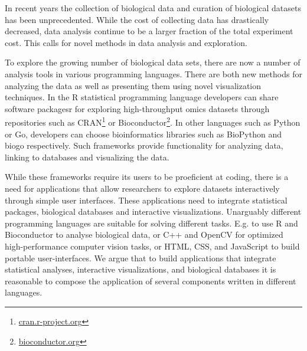 
In recent years the collection of biological data and curation of biological
datasets has been unprecedented. While the cost of collecting data has
drastically decreased, data analysis continue to be a larger fraction of the
total experiment cost.\cite{sboner2011real} This calls for novel methods in data
analysis and exploration. 

To explore the growing number of biological data sets, there are now a number of
analysis tools in various programming languages. There are
both new methods for analyzing the data as well as presenting them using novel
visualization techniques. 
In the R statistical programming language developers can share software
packagesr for exploring high-throughput omics datasets through repositories such
as CRAN\footnote{\url{cran.r-project.org}} or
Bioconductor\footnote{\url{bioconductor.org}}.
In other languages such as Python or Go, developers can choose bioinformatics
libraries such as BioPython\cite{biopython} and biogo\cite{biogo} respectively.
Such frameworks provide functionality for analyzing data, linking to databases
and visualizing the data. 

While these frameworks require its users to be proeficient at coding, there is a
need for applications that allow researchers to explore datasets interactively
through simple user interfaces. These applications need to integrate statistical
packages, biological databases and interactive visualizations. Unarguably
different programming languages are suitable for solving different tasks. E.g.
to use R and Bioconductor to analyse biological data, or C++ and OpenCV for
optimized high-performance computer vision tasks, or HTML, CSS, and JavaScript
to build portable user-interfaces. We argue that to build applications that
integrate statistical analyses, interactive visualizations, and biological
databases it is reasonable to compose the application of several components
written in different languages. 

